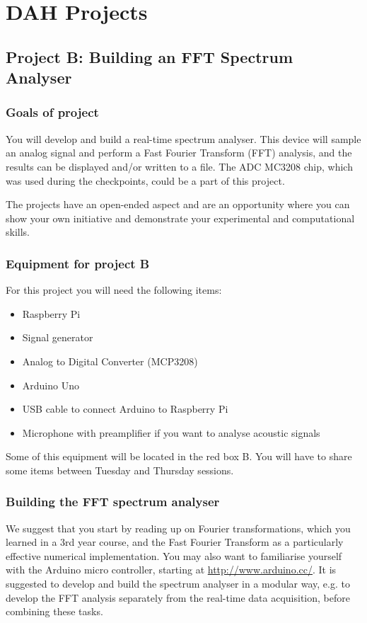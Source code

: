 \chapter{DAH Projects}
\label{sec:projects}


\section{Project B: Building an FFT Spectrum Analyser}

\subsection{Goals of project}

You will develop and build a real-time spectrum analyser.
This device will sample an analog signal and perform a Fast Fourier Transform (FFT) analysis, and the results can be displayed and/or written to a file.
The ADC MC3208 chip, which was used during the checkpoints, could be a part of this project. 

The projects have an open-ended aspect and are an opportunity where you can show your own initiative and demonstrate your experimental and computational skills. 


\subsection{Equipment for project B}

For this project you will need the following items:
\begin{itemize}
\item Raspberry Pi
\item Signal generator
\item Analog to Digital Converter (MCP3208)
\item Arduino Uno 
\item USB cable to connect Arduino to Raspberry Pi
\item Microphone with preamplifier if you want to analyse acoustic signals
\end{itemize}
Some of this equipment will be located in the red box B.
You will have to share some items between Tuesday and Thursday sessions.


\subsection{Building the FFT spectrum analyser}

We suggest that you start by reading up on Fourier transformations, which you learned in a 3rd year course, and the Fast Fourier Transform as a particularly effective numerical implementation.
You may also want to familiarise yourself with the Arduino micro controller, starting at \url{http://www.arduino.cc/}.
It is suggested to develop and build the spectrum analyser in a modular way, e.g. to develop the FFT analysis separately from the real-time data acquisition, before combining these tasks.

